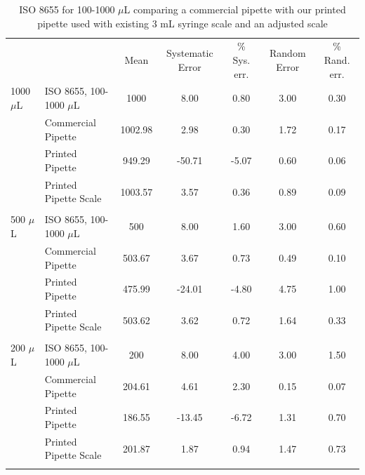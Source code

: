 \documentclass{naturegraphicx}
\begin{document}
\begin{table}
\begin{adjustwidth}{-0.75in}{-1.0in}
\centering
\caption{ISO 8655 for 100-1000 $\mu$L comparing a commercial pipette with our printed pipette used with existing 3 mL syringe scale and an adjusted scale}
\label{table3}
\begin{tabular}{llccccc}
&                       & Mean   & Systematic Error & \% Sys. err. & Random Error & \% Rand. err. \\
1000 $\mu$L & ISO 8655, 100-1000 $\mu$L & 1000    & 8.00             & 0.80         & 3.00         & 0.30          \\
& Commercial Pipette    & 1002.98 & 2.98             & 0.30         & 1.72         & 0.17          \\
& Printed Pipette       & 949.29  & -50.71           & -5.07        & 0.60         & 0.06          \\
& Printed Pipette Scale & 1003.57 & 3.57             & 0.36         & 0.89         & 0.09          \\
&                       &         &                  &              &              &               \\
500 $\mu$L  & ISO 8655, 100-1000 $\mu$L & 500     & 8.00             & 1.60         & 3.00         & 0.60          \\
& Commercial Pipette    & 503.67  & 3.67             & 0.73         & 0.49         & 0.10          \\
& Printed Pipette       & 475.99  & -24.01           & -4.80        & 4.75         & 1.00          \\
& Printed Pipette Scale & 503.62  & 3.62             & 0.72         & 1.64         & 0.33          \\
&                       &         &                  &              &              &               \\
200 $\mu$L  & ISO 8655, 100-1000 $\mu$L & 200     & 8.00             & 4.00         & 3.00         & 1.50          \\
& Commercial Pipette    & 204.61  & 4.61             & 2.30         & 0.15         & 0.07          \\
& Printed Pipette       & 186.55  & -13.45           & -6.72        & 1.31         & 0.70          \\
& Printed Pipette Scale & 201.87  & 1.87             & 0.94         & 1.47         & 0.73          \\
&                       &         &                  &              &              &               \\

\end{tabular}
\end{adjustwidth}
\end{table}
\end{document}
